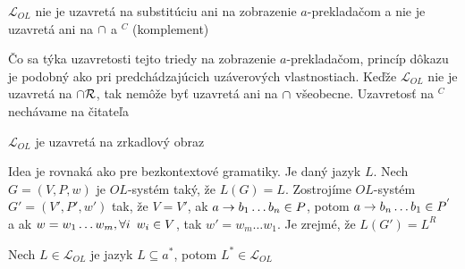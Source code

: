 \begin{dosledok}
    $\mathcal{L}_{OL}$ nie je uzavretá na substitúciu ani na
    zobrazenie $a$-prekladačom a nie je uzavretá ani na $\cap$ a
    $^{C}$ (komplement)
\end{dosledok}

\begin{dokaz}
    Čo sa týka uzavretosti tejto triedy na zobrazenie $a$-prekladačom,
    princíp dôkazu je podobný ako pri predchádzajúcich uzáverových
    vlastnostiach. Keďže $\mathcal{L}_{OL}$ nie je uzavretá na
    $\cap\mathcal{R}$, tak nemôže byť uzavretá ani na $\cap$
    všeobecne. Uzavretosť na $^{C}$ nechávame na čitateľa
\end{dokaz}

\begin{veta}
    $\mathcal{L}_{OL}$ je uzavretá na zrkadlový obraz
\end{veta}

\begin{dokaz}
    Idea je rovnaká ako pre bezkontextové gramatiky. Je daný jazyk
    $L$. Nech $G=(V,P,w)$ je $OL$-systém taký, že $L(G)=L$. Zostrojíme
    $OL$-systém $G'=(V',P',w')$ tak, že $V=V'$, ak $a\rightarrow b_{1}\dots
    b_{n}\in P$, potom $a\rightarrow b_{n}\dots b_{1}\in P^{'}$ a ak
    $w=w_{1}\dots w_{m},\forall i\enspace w_i\in V$, tak $w'=w_{m}\dots
    w_{1}$. Je zrejmé, že $L(G')=L^{R}$
\end{dokaz}

\begin{veta}
    Nech $L\in\mathcal{L}_{OL}$ je jazyk $L\subseteq a^{*}$, potom
    $L^{*}\in\mathcal{L}_{OL}$
\end{veta}

